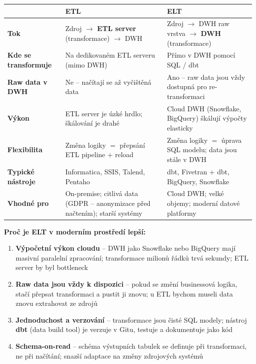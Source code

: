 \begin{center}
\begin{tabular}{p{1.4cm}p{5.4cm}p{5.4cm}}
\toprule
 & \textbf{ETL} & \textbf{ELT} \\
\midrule
\textbf{Tok} &
  Zdroj $\to$ \textbf{ETL server} (transformace) $\to$ DWH &
  Zdroj $\to$ DWH raw vrstva $\to$ \textbf{DWH} (transformace) \\
\midrule
\textbf{Kde se transformuje} &
  Na dedikovaném ETL serveru (mimo DWH) &
  Přímo v DWH pomocí SQL / dbt \\
\midrule
\textbf{Raw data v DWH} &
  Ne -- načítají se až vyčištěná data &
  Ano -- raw data jsou vždy dostupná pro re-transformaci \\
\midrule
\textbf{Výkon} &
  ETL server je úzké hrdlo; škálování je drahé &
  Cloud DWH (Snowflake, BigQuery) škálují výpočty elasticky \\
\midrule
\textbf{Flexibilita} &
  Změna logiky $=$ přepsání ETL pipeline + reload &
  Změna logiky $=$ úprava SQL modelu; data jsou stále v DWH \\
\midrule
\textbf{Typické nástroje} &
  Informatica, SSIS, Talend, Pentaho &
  dbt, Fivetran + dbt, BigQuery, Snowflake \\
\midrule
\textbf{Vhodné pro} &
  On-premise; citlivá data (GDPR -- anonymizace před načtením); starší systémy &
  Cloud DWH; velké objemy; moderní datové platformy \\
\bottomrule
\end{tabular}
\end{center}

\textbf{Proč je ELT v moderním prostředí lepší:}
\begin{enumerate}
  \item \textbf{Výpočetní výkon cloudu} -- DWH jako Snowflake nebo BigQuery mají masivní paralelní
    zpracování; transformace milionů řádků trvá sekundy; ETL server by byl bottleneck
  \item \textbf{Raw data jsou vždy k dispozici} -- pokud se změní businessová logika, stačí přepsat
    transformaci a pustit ji znovu; u ETL bychom museli data znovu extrahovat ze zdrojů
  \item \textbf{Jednoduchost a verzování} -- transformace jsou čisté SQL modely; nástroj \textbf{dbt}
    (data build tool) je verzuje v Gitu, testuje a dokumentuje jako kód
  \item \textbf{Schema-on-read} -- schéma výstupních tabulek se definuje při transformaci, ne při načítání;
    snazší adaptace na změny zdrojových systémů
\end{enumerate}

